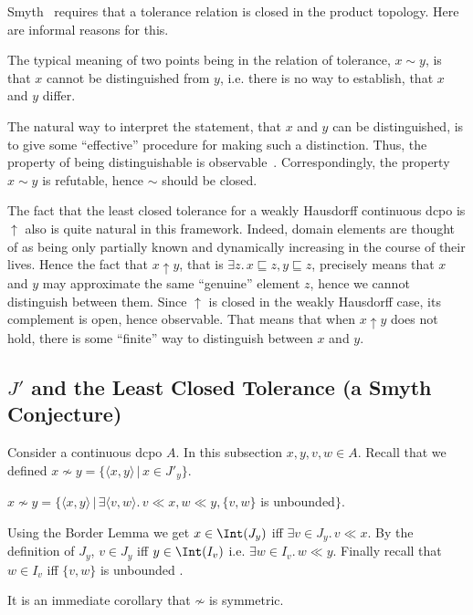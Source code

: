 Smyth~\cite{Smyth2} requires that a tolerance relation is closed
in the product topology. Here are informal reasons for this.

The typical meaning of two points being in the relation of tolerance,
$x \sim y$, is that $x$ cannot be distinguished from $y$, i.e.
there is no way to establish, that $x$ and $y$ differ.

The natural way to interpret the statement, that $x$ and $y$ can
be distinguished, is to give some ``effective'' procedure for
making such a distinction. Thus, the property of being distinguishable
is observable~\cite{Smyth}. Correspondingly, the property $x \sim y$
is refutable, hence $\sim$ should be closed.

The fact that the least closed tolerance for a weakly Hausdorff
continuous dcpo is $\uparrow$ also is quite natural in this framework.
Indeed, domain elements are thought of as being only partially known
and dynamically increasing in the course of their lives. Hence the
fact that $x \uparrow y$, that is $\exists z.\, x \sqsubseteq z,
y \sqsubseteq z$, precisely means that $x$ and $y$ may approximate the
same ``genuine'' element $z$, hence we cannot distinguish between them.
Since $\uparrow$ is closed in the weakly Hausdorff case, its complement
is open, hence observable. That means that when $x \uparrow y$ does
not hold, there is some ``finite'' way to distinguish between $x$ and
$y$.

\subsection{$J'$ and the Least Closed Tolerance (a Smyth Conjecture)}

Consider a continuous dcpo $A$. In this subsection $x, y, v, w \in A$.
Recall that we defined
$x \not\sim y = \{\langle x,y \rangle\,|\, x \in J'_y\}$.

\begin{Lemma}
$x \not\sim y = \{\langle x, y \rangle\,|\, \exists \langle v, w
\rangle.\, v \ll x, w \ll y, \{v, w\}$ is unbounded$\}$.
\end{Lemma}

\Proof
Using the Border Lemma we get $x\in \Int(J_y)$ iff $\exists v \in
J_y.\, v \ll x$.  By the definition of $J_y$, $v \in J_y$ iff $y \in
\Int(I_v)$ i.e. $\exists w \in I_v.\, w \ll y$.  
Finally recall that $w \in
I_v $ iff $\{v,w\}$ is unbounded .
\eproof

It is an immediate corollary
that $\not\sim$ is symmetric. 

